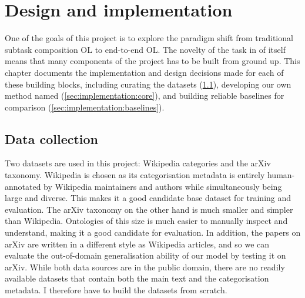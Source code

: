 \chapter{Design and implementation}

One of the goals of this project is to explore the paradigm shift from traditional subtask composition OL to end-to-end OL. The novelty of the task in of itself means that many components of the project has to be built from ground up. This chapter documents the implementation and design decisions made for each of these building blocks, including curating the datasets (\cref{sec:implementation:data-collection}), developing our own method named \textbf{\name} (\cref{sec:implementation:core}), and building reliable baselines for comparison (\cref{sec:implementation:baselines}).



\section{Data collection}  \label{sec:implementation:data-collection}

Two datasets are used in this project: Wikipedia categories and the arXiv taxonomy. Wikipedia is chosen as its categorisation metadata is entirely human-annotated by Wiki\-pedia maintainers and authors while simultaneously being large and diverse. This makes it a good candidate base dataset for training and evaluation. The arXiv taxonomy on the other hand is much smaller and simpler than Wikipedia. Ontologies of this size is much easier to manually inspect and understand, making it a good candidate for evaluation. In addition, the papers on arXiv are written in a different style as Wikipedia articles, and so we can evaluate the out-of-domain generalisation ability of our model by testing it on arXiv. While both data sources are in the public domain, there are no readily available datasets that contain both the main text and the categorisation metadata. I therefore have to build the datasets from scratch.

